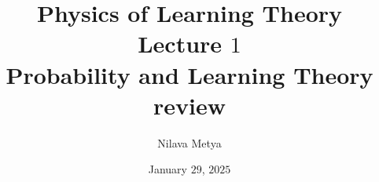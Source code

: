 
\usepackage{wrapfig}
\setlength{\columnsep}{0.7cm}


\usepackage[
backend=biber,
style=alphabetic,
]{biblatex}

\title{\textbf{Physics of Learning Theory}\\ Lecture $1$ \\
Probability and Learning Theory review}
\usepackage{quiver}
\usepackage[nobottomtitles*]{titlesec}
\usepackage{titletoc}
\author{Nilava Metya}
\date{\vspace{-0.7in}January $29$, $2025$}
\usepackage{pdfpages}
\usepackage{fancyhdr}
	\pagestyle{fancyplain}
	\fancyhf{}
	\fancyhead[R]{\thepage}
\newcommand{\fa}{~\forall~}
\usepackage{algpseudocode}
\renewcommand{\algorithmicrequire}{\textbf{Input:}}
\renewcommand{\algorithmicensure}{\textbf{Output:}}


\maketitle

